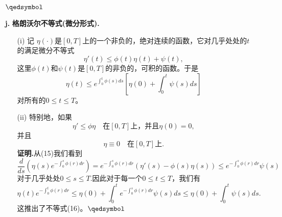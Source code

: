 \documentclass[leqno]{article}%
\begin{document}
\begin{enumerate}[fullwidth,itemindent=0em]
 $\hfill\qedsymbol$
\item[\textbf{j.}] \textbf{格朗沃尔不等式(微分形式).}
\begin{enumerate}[fullwidth,itemindent=2em]
  \item[(i)]记 $\eta(\cdot)$是$[0,T]$上的一个非负的，绝对连续的函数，它对几乎处处的$t$的满足微分不等式
\begin{equation}
\eta'(t)\leq\phi(t)\eta(t)+\psi(t),
\end{equation}
这里$\phi(t)$和$\psi(t)$是$[0,T]$的非负的，可积的函数。于是
\begin{equation}
\eta(t)\leq e^{\int_{0}^{t}\phi(s)ds}\left[\eta(0)+\int_{0}^{t}\psi(s)ds\right]
\end{equation}
对所有的$0\leq t\leq T$。\par
\item[(ii)]特别地，如果
\begin{equation*}
\eta'\leq \phi\eta\quad \text{在}[0,T]\text{上，并且}\eta(0)=0,
\end{equation*}
并且
\begin{equation*}
\eta\equiv0\quad \text{在}[0,T]\text{上}.
\end{equation*}
\textbf{证明.}从(15)我们看到
\begin{equation*}
\frac{d}{ds}(\eta (s)e^{-\int_{0}^{s}\phi(r)dr})=e^{-\int_{0}^{s}\phi(r)dr}(\eta'(s)-\phi(s)\eta(s))\leq e^{-\int_{0}^{s}\phi(r)dr}\psi(s)
\end{equation*}
对于几乎处处$0\leq s\leq T.$因此对于每一个$0\leq t\leq T$，我们有
\begin{equation*}
\eta(t)e^{-\int_{0}^{t}\phi(r)dr}\leq\eta(0)+\int_{0}^{t}e^{-\int_{0}^{s}\phi(r)dr}\psi(s)ds\leq\eta(0)+\int_{0}^{t}\psi(s)ds.
\end{equation*}
这推出了不等式(16)。$\hfill\qedsymbol$


\end{enumerate}



\end{enumerate}
\end{document}
